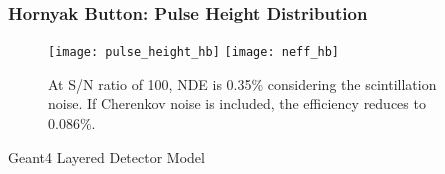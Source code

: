 \documentclass[fleqn]{beamer}
\begin{document}
     \begin{frame}
      \frametitle{Hornyak Button: Pulse Height Distribution}
      \begin{figure}
       \texttt{[image: pulse\_height\_hb]}
       \texttt{[image: neff\_hb]}
       \caption{At S/N ratio of 100, NDE is 0.35\% considering the  scintillation noise. If Cherenkov noise is included, the efficiency reduces to 0.086\%.}
      \end{figure}
     \end{frame}

     \begin{frame}
     \centering
      Geant4 Layered Detector Model
     \end{frame}

% 
% 
% 
% 
% 
% 
\end{document}
